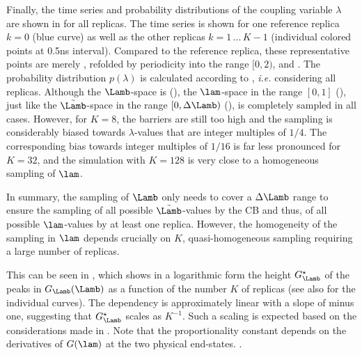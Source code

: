 Finally, the time series and probability distributions
of the coupling variable $\lambda$ are shown in  for all replicas.
%
The time series is shown for one reference replica $k=0$ (blue curve) as well as 
 the other replicas $k=1\,...\,K-1$ (individual colored points at 0.5\unit{ns} interval).
%
Compared to the reference replica, these representative points are merely 
, refolded by periodicity into the range $[0,2)$, 
and \radd{the points in the range $[1,2)$ mirrored into the range $[0,1]$} 
.
%
The probability distribution $p(\lambda)$ is calculated 
according to , {\em i.e.} considering all replicas.
%
Although the $\Lamb$-space \radd{in the range $[0,2\pi)$} is  (), 
the $\lam$-space in the range $[0,1]$ (), just like the $\tilde{\Lamb}$-space
in the range $[0,\Delta \Lamb)$ (), is completely sampled in all cases.
%
However, for $K=8$, the barriers are still too high
and the sampling is considerably biased towards
$\lambda$-values that are integer multiples of $1/4$.
The corresponding bias towards integer multiples of $1/16$ 
is far less pronounced for $K=32$, and the simulation
with $K=128$ is very close to a homogeneous sampling
of $\lam$.


In summary, the sampling of $\Lamb$ only needs to cover 
a $\Delta \Lamb$ range to ensure the sampling 
of all possible 
$\tilde{\Lamb}$-values
by the CB
and thus,
of all possible $\lam$-values
by at least one replica.
%
However, the homogeneity of the sampling
in $\lam$ depends crucially
on $K$, quasi-homogeneous sampling requiring 
a large number of replicas.
%

%
This can be seen in ,
which shows in a logarithmic form the height $G^\star_{\Lamb}$ of the peaks
 in $G_{\Lamb}(\Lamb)$ as a function
of the number $K$ of replicas (see also  for the individual curves).
%
The dependency is approximately linear with a slope
of minus one, suggesting that $G^\star_{\Lamb}$
scales as $K^{-1}$. Such a scaling is expected based on the considerations
made in . Note that the proportionality constant depends on the derivatives of $G(\lam)$
at the two physical end-states. .
%


